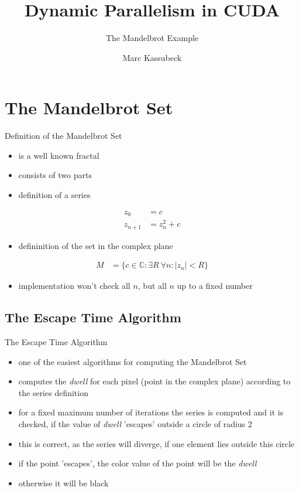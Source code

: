 \documentclass[fleqn,11pt,aspectratio=43]{beamer}
\title{Dynamic Parallelism in CUDA}
\subtitle{The Mandelbrot Example}
\author{Marc Kassubeck}
\begin{document}

\begin{frame}[plain]
\titlepage
\end{frame}

\begin{frame}[plain]
  \tableofcontents
\end{frame}


\section{The Mandelbrot Set}

\begin{frame}{Definition of the Mandelbrot Set}
	\begin{itemize}
		\item is a well known fractal
		\item consists of two parts
		\item definition of a series
	\end{itemize}	
	\begin{align*}
		z_0 &= c\\
		z_{n+1} &= z_n^2 + c
	\end{align*}
	\begin{itemize}
		\item defininition of the set in the complex plane
	\end{itemize}
	\begin{align*}
		M &= \{c \in \mathbb{C}: \exists R\ \forall n: \left| z_n \right| < R \}
	\end{align*}
	\begin{itemize}
		\item implementation won't check all $n$, but all $n$ up to a fixed number
	\end{itemize}
\end{frame}

\subsection{The Escape Time Algorithm}

\begin{frame}{The Escape Time Algorithm}
	\begin{itemize}
		\item one of the easiest algorithms for computing the Mandelbrot Set
		\item computes the \textit{dwell} for each pixel (point in the complex plane) according to the series definition
		\item for a fixed maximum number of iterations the series is computed and it is checked, if the value of \textit{dwell} 'escapes' outside a circle of radius 2
		\item this is correct, as the series will diverge, if one element lies outside this circle
		\item if the point 'escapes', the color value of the point will be the \textit{dwell}
		\item otherwise it will be black
	\end{itemize}
\end{frame}
\end{document}
